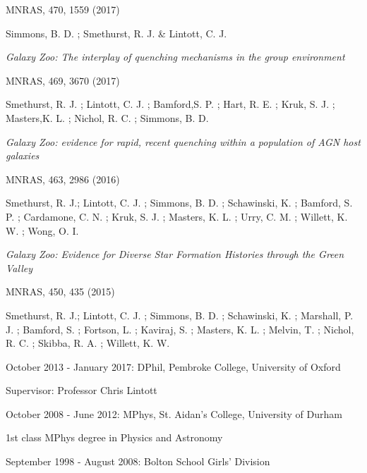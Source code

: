 \documentclass{article}
\begin{document}
\indent \indent MNRAS, 470, 1559 (2017)

\indent \indent Simmons, B. D. ; Smethurst, R. J. \& Lintott, C. J.


\medskip


\hangindent=15pt \indent \emph{Galaxy Zoo: The interplay of quenching mechanisms in the group environment}

\indent \indent MNRAS, 469, 3670 (2017)

\hangindent=30pt \indent \indent Smethurst, R. J. ; Lintott, C. J. ; Bamford,S. P. ; Hart, R. E. ; Kruk, S. J. ; Masters,K. L. ; Nichol, R. C. ; Simmons, B. D.

\medskip

\hangindent=15pt \indent \emph{Galaxy Zoo: evidence for rapid, recent quenching within a population of AGN host galaxies}

\indent \indent MNRAS, 463, 2986 (2016)

\hangindent=30pt \indent \indent Smethurst, R. J.; Lintott, C. J. ; Simmons, B. D. ; Schawinski, K. ; Bamford, S. P. ; Cardamone, C. N. ; Kruk, S. J. ; Masters, K. L. ; Urry, C. M. ; Willett, K. W. ; Wong, O. I.

\medskip

\hangindent=15pt \indent \emph{Galaxy Zoo: Evidence for Diverse Star Formation Histories through the Green Valley}

\indent \indent MNRAS, 450, 435 (2015)

\hangindent=30pt \indent \indent Smethurst, R. J.; Lintott, C. J. ; Simmons, B. D. ; Schawinski, K. ; Marshall, P. J. ; Bamford, S. ; Fortson, L. ; Kaviraj, S. ; Masters, K. L. ; Melvin, T. ; Nichol, R. C. ; Skibba, R. A. ; Willett, K. W.

\noindent\makebox[\linewidth]{\rule{0.8\paperwidth}{0.2pt}}


\indent October 2013 - January 2017: DPhil, Pembroke College, University of Oxford

\indent \indent Supervisor: Professor Chris Lintott

\smallskip

\indent October 2008 - June 2012: MPhys, St. Aidan's College, University of Durham

\indent \indent 1st class MPhys degree in Physics and Astronomy

\smallskip

\indent September 1998 - August 2008: Bolton School Girls' Division
\end{document}
